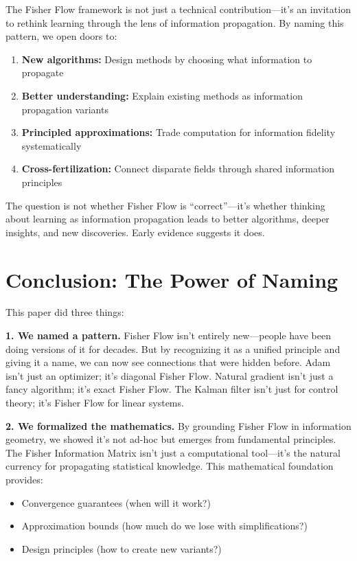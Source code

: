 \documentclass[11pt]{article}
\begin{document}
The Fisher Flow framework is not just a technical contribution—it's an invitation to rethink learning through the lens of information propagation. By naming this pattern, we open doors to:

\begin{enumerate}
\item \textbf{New algorithms:} Design methods by choosing what information to propagate
\item \textbf{Better understanding:} Explain existing methods as information propagation variants
\item \textbf{Principled approximations:} Trade computation for information fidelity systematically
\item \textbf{Cross-fertilization:} Connect disparate fields through shared information principles
\end{enumerate}

The question is not whether Fisher Flow is ``correct''—it's whether thinking about learning as information propagation leads to better algorithms, deeper insights, and new discoveries. Early evidence suggests it does.

\section{Conclusion: The Power of Naming}

This paper did three things:

\textbf{1. We named a pattern.} Fisher Flow isn't entirely new—people have been doing versions of it for decades. But by recognizing it as a unified principle and giving it a name, we can now see connections that were hidden before. Adam isn't just an optimizer; it's diagonal Fisher Flow. Natural gradient isn't just a fancy algorithm; it's exact Fisher Flow. The Kalman filter isn't just for control theory; it's Fisher Flow for linear systems.

\textbf{2. We formalized the mathematics.} By grounding Fisher Flow in information geometry, we showed it's not ad-hoc but emerges from fundamental principles. The Fisher Information Matrix isn't just a computational tool—it's the natural currency for propagating statistical knowledge. This mathematical foundation provides:
\begin{itemize}
\item Convergence guarantees (when will it work?)
\item Approximation bounds (how much do we lose with simplifications?)
\item Design principles (how to create new variants?)
\end{itemize}
\end{document}
